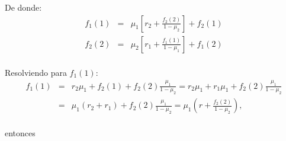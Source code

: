 \documentclass{article}
\begin{document}
De donde:
\begin{eqnarray*}
f_{1}\left(1\right)&=&\mu_{1}\left[r_{2}+\frac{f_{2}\left(2\right)}{1-\mu_{2}}\right]+f_{2}\left(1\right)\\
f_{2}\left(2\right)&=&\mu_{2}\left[r_{1}+\frac{f_{1}\left(1\right)}{1-\mu_{1}}\right]+f_{1}\left(2\right)\\
\end{eqnarray*}

Resolviendo para $f_{1}\left(1\right)$:
\begin{eqnarray*}
f_{1}\left(1\right)&=&r_{2}\mu_{1}+f_{2}\left(1\right)+f_{2}\left(2\right)\frac{\mu_{1}}{1-\mu_{2}}=r_{2}\mu_{1}+r_{1}\mu_{1}+f_{2}\left(2\right)\frac{\mu_{1}}{1-\mu_{2}}\\
&=&\mu_{1}\left(r_{2}+r_{1}\right)+f_{2}\left(2\right)\frac{\mu_{1}}{1-\mu_{2}}=\mu_{1}\left(r+\frac{f_{2}\left(2\right)}{1-\mu_{2}}\right),\\
\end{eqnarray*}

entonces
\end{document}
